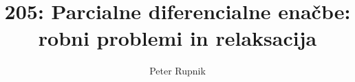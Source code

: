 \documentclass[a4paper,oneside,12pt]{article}
\title{205: Parcialne diferencialne enačbe: robni problemi in relaksacija}
\author{Peter Rupnik}
\begin{document}
\maketitle

\section{}

\section{}

\end{document}
